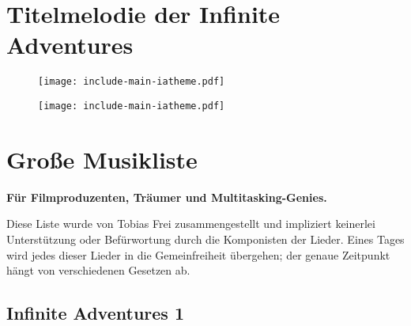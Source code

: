 \chapter{Titelmelodie der Infinite Adventures}

% 
%
%

\begin{figure}[p]
	\texttt{[image: include-main-iatheme.pdf]}
\end{figure}

\begin{figure}[p]
	\texttt{[image: include-main-iatheme.pdf]}
\end{figure}


\chapter{Große Musikliste}

\textbf{Für Filmproduzenten, Träumer und Multitasking-Genies.}

Diese Liste wurde von Tobias Frei zusammengestellt und impliziert keinerlei Unterstützung oder Befürwortung durch die Komponisten der Lieder. Eines Tages wird jedes dieser Lieder in die Gemeinfreiheit übergehen; der genaue Zeitpunkt hängt von verschiedenen Gesetzen ab.

\section{Infinite Adventures 1}

